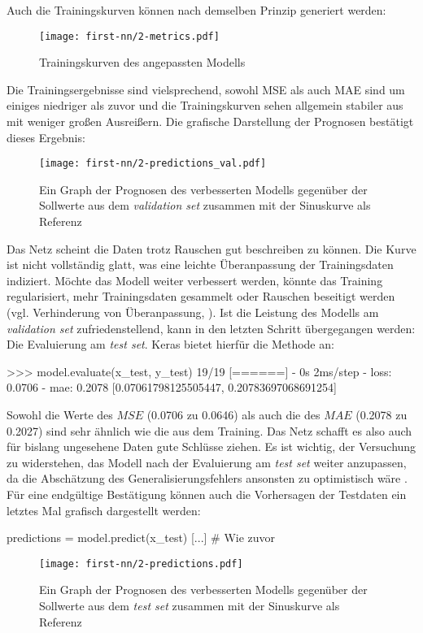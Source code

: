Auch die Trainingskurven können nach demselben Prinzip
generiert werden:
\begin{figure}[h!]
  \centering
  \texttt{[image: first-nn/2-metrics.pdf]}
  \caption{Trainingskurven des angepassten Modells}
\end{figure}

\noindent
Die Trainingsergebnisse sind vielsprechend, sowohl MSE als auch MAE
sind um einiges niedriger als zuvor und die Trainingskurven
sehen allgemein stabiler aus mit weniger großen Ausreißern.
Die grafische Darstellung der Prognosen bestätigt dieses Ergebnis:
\begin{figure}[h!]
  \centering
  \texttt{[image: first-nn/2-predictions\_val.pdf]}
  \caption{Ein Graph der Prognosen des verbesserten Modells gegenüber der Sollwerte aus dem
  \textit{validation set} zusammen mit der Sinuskurve als Referenz}
\end{figure}

\noindent
Das Netz scheint die Daten trotz Rauschen gut beschreiben zu können.
Die Kurve ist nicht vollständig glatt, was eine leichte Überanpassung der Trainingsdaten
indiziert. Möchte das Modell weiter verbessert werden,
könnte das Training regularisiert,
mehr Trainingsdaten gesammelt oder Rauschen beseitigt werden
(vgl. Verhinderung von Überanpassung, \cite[28]{book:hands-on-ml}).
Ist die Leistung des Modells am \textit{validation set} zufriedenstellend,
kann in den letzten Schritt übergegangen werden: Die Evaluierung am \textit{test set}.
Keras bietet hierfür die Methode  an:
\begin{pyconcode}
>>> model.evaluate(x_test, y_test)
19/19 [======] - 0s 2ms/step - loss: 0.0706 - mae: 0.2078
[0.07061798125505447, 0.20783697068691254]
\end{pyconcode}
Sowohl die Werte des $MSE$ (\num{0.0706} zu \num{0.0646}) als auch
die des $MAE$ (\num{0.2078} zu \num{0.2027}) sind sehr ähnlich
wie die aus dem Training. Das Netz schafft es also auch für
bislang ungesehene Daten gute Schlüsse ziehen.
Es ist wichtig, der Versuchung zu widerstehen, das Modell nach
der Evaluierung am \textit{test set} weiter anzupassen, da die Abschätzung
des Generalisierungsfehlers ansonsten zu optimistisch wäre
\parencite[80]{book:hands-on-ml}.
Für eine endgültige Bestätigung können auch die Vorhersagen
der Testdaten ein letztes Mal grafisch dargestellt werden:
\begin{pythoncode}
predictions = model.predict(x_test)
[...] # Wie zuvor
\end{pythoncode}
\begin{figure}[h!]
  \centering
  \texttt{[image: first-nn/2-predictions.pdf]}
  \caption{Ein Graph der Prognosen des verbesserten Modells gegenüber der Sollwerte aus dem
  \textit{test set} zusammen mit der Sinuskurve als Referenz}
  \label{fig:predictions-train-set}
\end{figure}

